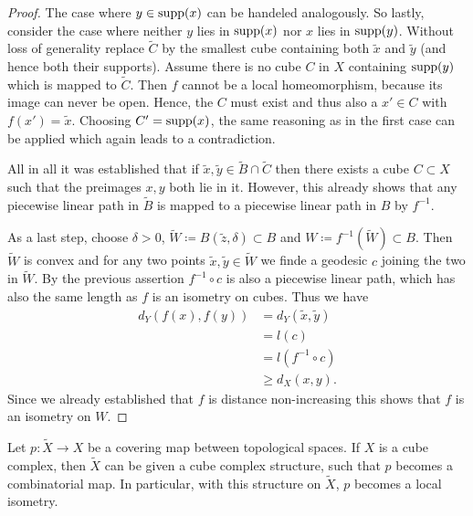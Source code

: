 \begin{proof}
  The case where \(y \in \operatorname{supp}(x)\) can be handeled analogously. So lastly, consider the case where neither \(y\) lies in \(\operatorname{supp}(x)\) nor \(x\) lies in \(\operatorname{supp}(y)\). Without loss of generality replace \(\tilde C\) by the smallest cube containing both \(\tilde x\) and \(\tilde y\) (and hence both their supports). Assume there is no cube \(C\) in \(X\) containing \(\operatorname{supp}(y)\) which is mapped to \(\tilde C\). Then \(f\) cannot be a local homeomorphism, because its image can never be open. Hence, the \(C\) must exist and thus also a \(x' \in C\) with \(f(x') = \tilde x\). Choosing \(C' = \operatorname{supp}(x)\), the same reasoning as in the first case can be applied which again leads to a contradiction.

  All in all it was established that if \(\tilde x, \tilde y \in \tilde B \cap \tilde C\) then there exists a cube \(C \subset X\) such that the preimages \(x, y\) both lie in it. However, this already shows that any piecewise linear path in \(\tilde B\) is mapped to a piecewise linear path in \(B\) by \(f^{-1}\).

  As a last step, choose \(\delta > 0\), \(\tilde W \coloneqq B(\tilde z, \delta) \subset B\) and \(W \coloneqq f^{-1}(\tilde W) \subset B\). Then \(\tilde W\) is convex and for any two points \(\tilde x, \tilde y \in \tilde W\) we finde a geodesic \(c\) joining the two in \(\tilde W\). By the previous assertion \(f^{-1} \circ c\) is also a piecewise linear path, which has also the same length as \(f\) is an isometry on cubes. Thus we have
  \begin{align*}
    d_Y(f(x), f(y))
    & = d_Y(\tilde x, \tilde y)\\
    & = l(c)\\
    & = l(f^{-1} \circ c)\\
    & \geq d_X(x,y).
  \end{align*}
  Since we already established that \(f\) is distance non-increasing this shows that \(f\) is an isometry on \(W\).
\end{proof}

\begin{prop}
  \label{prop:covering}
  Let \(p \colon \tilde X \to X\) be a covering map between topological spaces. If \(X\) is a cube complex, then \(\tilde X\) can be given a cube complex structure, such that \(p\) becomes a combinatorial map. In particular, with this structure on \(\tilde X\), \(p\) becomes a local isometry.
\end{prop}

